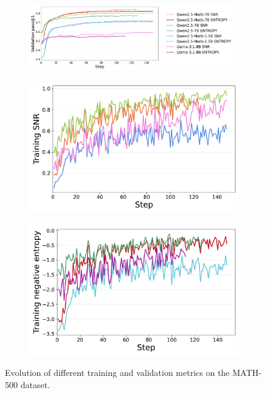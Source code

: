 \begin{figure}[h!]
  \centering
  \begin{subfigure}{0.98\textwidth}
      \centering
      \includegraphics[width=\textwidth]{figs/plot_pass1_validation.pdf}
      \label{fig:evolution_validation_pass@1}
  \end{subfigure}
  \vfill
  \begin{subfigure}{0.49\textwidth}
      \centering
      \includegraphics[width=\textwidth]{figs/plot_training_SNR.pdf}
      \label{fig:evolution_training_snr}
  \end{subfigure}
  \hfill
  \begin{subfigure}{0.49\textwidth}
      \centering
      \includegraphics[width=\textwidth]{figs/plot_training_negative_entropy.pdf}
      \label{fig:evolution_training_negative_entropy}
  \end{subfigure}
  \caption{Evolution of different training and validation metrics on the MATH-500 dataset.}
  \label{fig:evolution_during_training}
\end{figure}


